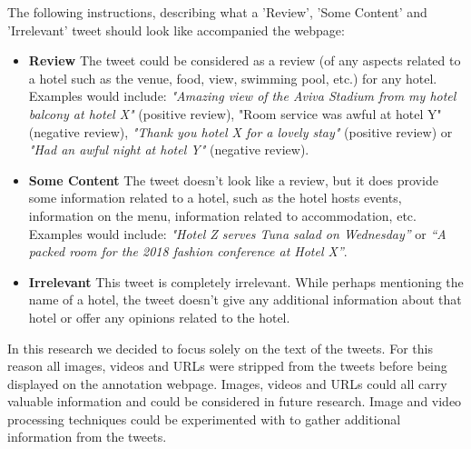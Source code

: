 The following instructions, describing what a 'Review', 'Some Content' and 'Irrelevant' tweet should look like accompanied the webpage:
\begin{itemize}
    \item \textbf{Review} \newline
    The tweet could be considered as a review (of any aspects related to a hotel such as the venue, food, view, swimming pool, etc.) for any hotel. Examples would include: \emph{"Amazing view of the Aviva Stadium from my hotel balcony at hotel X"} (positive review), "Room service was awful at hotel Y" (negative review), \emph{"Thank you hotel X for a lovely stay"} (positive review) or \emph{"Had an awful night at hotel Y"} (negative review).
    \item \textbf{Some Content} \newline
    The tweet doesn't look like a review, but it does provide some information related to a hotel, such as the hotel hosts events, information on the menu, information related to accommodation, etc. Examples would include: \emph{"Hotel Z serves Tuna salad on Wednesday”} or \emph{“A packed room for the 2018 fashion conference at Hotel X”}.
    \item \textbf{Irrelevant} \newline
    This tweet is completely irrelevant. While perhaps mentioning the name of a hotel, the tweet doesn't give any additional information about that hotel or offer any opinions related to the hotel.
\end{itemize}

In this research we decided to focus solely on the text of the tweets. For this reason all images, videos and URLs were stripped from the tweets before being displayed on the annotation webpage. Images, videos and URLs could all carry valuable information and could be considered in future research. Image and video processing techniques could be experimented with to gather additional information from the tweets.   

